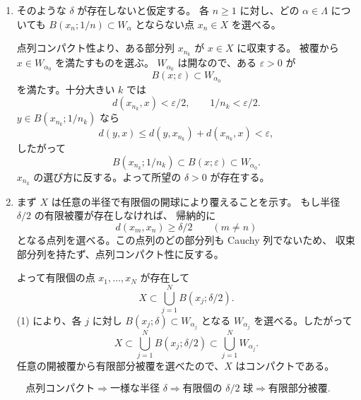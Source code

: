 \begin{enumerate}
  \item そのような \(\delta\) が存在しないと仮定する。
  各 \(n\ge1\) に対し、どの \(\alpha\in\Lambda\) についても
  \(B(x_n;1/n)\subset W_\alpha\) とならない点 \(x_n\in X\) を選べる。

  点列コンパクト性より、ある部分列 \(x_{n_k}\) が \(x\in X\) に収束する。
  被覆から \(x\in W_{\alpha_0}\) を満たすものを選ぶ。
  \(W_{\alpha_0}\) は開なので、ある \(\varepsilon>0\) が
  \[
  B(x;\varepsilon)\subset W_{\alpha_0}
  \]
  を満たす。十分大きい \(k\) では
  \[
  d(x_{n_k},x)<\varepsilon/2,\qquad 1/n_k<\varepsilon/2.
  \]
  \(y\in B(x_{n_k};1/n_k)\) なら
  \[
  d(y,x)\le d(y,x_{n_k})+d(x_{n_k},x)<\varepsilon,
  \]
  したがって
  \[
  B(x_{n_k};1/n_k)\subset B(x;\varepsilon)\subset W_{\alpha_0}.
  \]
  \(x_{n_k}\) の選び方に反する。よって所望の \(\delta>0\) が存在する。

  \item まず \(X\) は任意の半径で有限個の開球により覆えることを示す。
  もし半径 \(\delta/2\) の有限被覆が存在しなければ、
  帰納的に
  \[
  d(x_m,x_n)\ge\delta/2\qquad(m\ne n)
  \]
  となる点列を選べる。この点列のどの部分列も Cauchy 列でないため、
  収束部分列を持たず、点列コンパクト性に反する。

  よって有限個の点 \(x_1,\ldots,x_N\) が存在して
  \[
  X\subset\bigcup_{j=1}^N B(x_j;\delta/2).
  \]
  (1) により、各 \(j\) に対し
  \(B(x_j;\delta)\subset W_{\alpha_j}\) となる
  \(W_{\alpha_j}\) を選べる。したがって
  \[
  X\subset\bigcup_{j=1}^N B(x_j;\delta/2)
  \subset\bigcup_{j=1}^N W_{\alpha_j}.
  \]
  任意の開被覆から有限部分被覆を選べたので、\(X\) はコンパクトである。
\end{enumerate}

\begin{pointbox}[証明の二段階]
\[
\text{点列コンパクト}
\Longrightarrow\text{一様な半径 }\delta
\Longrightarrow\text{有限個の }\delta/2\text{ 球}
\Longrightarrow\text{有限部分被覆}.
\]
\end{pointbox}


